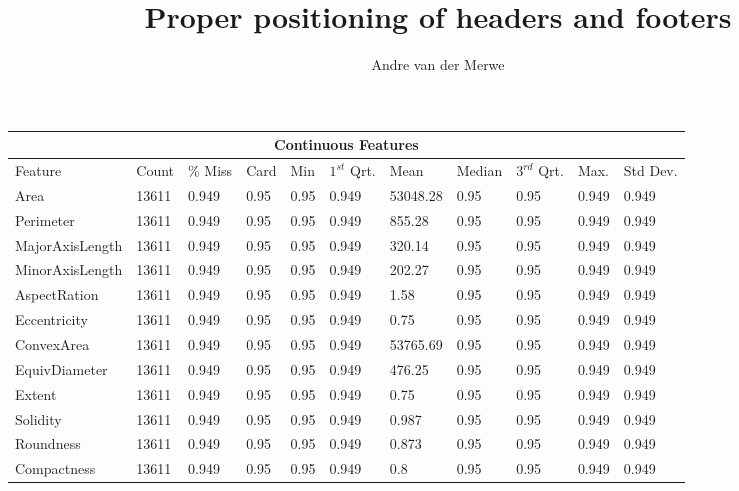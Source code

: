 \documentclass[10pt, conference]{IEEEtran}
\title{Proper positioning of headers and footers}
\author{Andre van der Merwe}
\begin{document}
\maketitle

\begin{center}
    \begin{tabular}{ |p{2.5cm}||p{1.32cm}|p{1.32cm}|p{1.32cm}|p{1.32cm}|p{1.32cm}|p{1.32cm}|p{1.32cm}|p{1.32cm}|p{1.32cm}|p{1.32cm}| }
        \hline
        \multicolumn{11}{|c|}{Continuous Features} \\
        \hline
        Feature&Count&\% Miss&Card&Min&$1^{st}$ Qrt.&Mean&Median&$3^{rd}$ Qrt.&Max.&Std Dev.\\
        \hline
        Area                &13611  &0.949  &0.95   &0.95   &0.949  &53048.28  &0.95   &0.95   &0.949  &0.949\\
        Perimeter           &13611  &0.949  &0.95   &0.95   &0.949  &855.28  &0.95   &0.95   &0.949  &0.949\\
        MajorAxisLength     &13611  &0.949  &0.95   &0.95   &0.949  &320.14  &0.95   &0.95   &0.949  &0.949\\
        MinorAxisLength     &13611  &0.949  &0.95   &0.95   &0.949  &202.27  &0.95   &0.95   &0.949  &0.949\\
        AspectRation        &13611  &0.949  &0.95   &0.95   &0.949  &1.58  &0.95   &0.95   &0.949  &0.949\\
        Eccentricity        &13611  &0.949  &0.95   &0.95   &0.949  &0.75  &0.95   &0.95   &0.949  &0.949\\
        ConvexArea          &13611  &0.949  &0.95   &0.95   &0.949  &53765.69  &0.95   &0.95   &0.949  &0.949\\
        EquivDiameter       &13611  &0.949  &0.95   &0.95   &0.949  &476.25  &0.95   &0.95   &0.949  &0.949\\
        Extent              &13611  &0.949  &0.95   &0.95   &0.949  &0.75  &0.95   &0.95   &0.949  &0.949\\
        Solidity            &13611  &0.949  &0.95   &0.95   &0.949  &0.987  &0.95   &0.95   &0.949  &0.949\\
        Roundness           &13611  &0.949  &0.95   &0.95   &0.949  &0.873  &0.95   &0.95   &0.949  &0.949\\
        Compactness         &13611  &0.949  &0.95   &0.95   &0.949  &0.8  &0.95   &0.95   &0.949  &0.949\\

\end{tabular}
\end{center}
\end{document}
